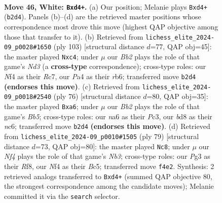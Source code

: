 \documentclass[11pt]{article}
\begin{document}
\clearpage

\begin{figure}[p]\centering
\begin{subfigure}{0.46\textwidth}\centering
\resizebox{\linewidth}{!}{%
\newchessgame
\chessboard[
  setfen={r2b4/1p5p/nk4pP/p4p2/P2prN2/3R2P1/1B6/R6K w - - 2 46},
  showmover=false,
  pgfstyle=straightmove, color=movearrow, markmove={b2-d4}
]}
\caption{}
\end{subfigure}\hfill
\begin{subfigure}{0.46\textwidth}\centering
\resizebox{\linewidth}{!}{%
\newchessgame
\chessboard[
  setfen={8/2r2kp1/1R1npp2/2r4P/p1P3KP/P3P3/2RN1P2/8 b - - 0 52},
  showmover=false,
  pgfstyle=straightmove, color=movearrow, markmove={d6-c4}
]}
\caption{}
\end{subfigure}
\\[4pt]
\begin{subfigure}{0.46\textwidth}\centering
\resizebox{\linewidth}{!}{%
\newchessgame
\chessboard[
  setfen={4r3/kb1p2p1/p1nr2N1/1B2pP2/R3P3/2P1K1P1/8/R7 w - - 13 39},
  showmover=false,
  pgfstyle=straightmove, color=movearrow, markmove={b5-a6}
]}
\caption{}
\end{subfigure}\hfill
\begin{subfigure}{0.46\textwidth}\centering
\resizebox{\linewidth}{!}{%
\newchessgame
\chessboard[
  setfen={r4rk1/P7/1n1p4/1RbPp3/4P3/5Pp1/6P1/R4K2 b - - 2 40},
  showmover=false,
  pgfstyle=straightmove, color=movearrow, markmove={b6-c8}
]}
\caption{}
\end{subfigure}
\caption{\textbf{Move 46, White: \texttt{Bxd4+}.} (a) Our position; Melanie plays \texttt{Bxd4+} (\texttt{b2d4}). Panels (b)--(d) are the retrieved master positions whose correspondence most drove this move (highest QAP objective among those that transfer to it). (b) Retrieved from \texttt{lichess\_elite\_2024-09\_p0028\#1650} (ply 103) [structural distance $d$=77, QAP obj=45]: the master played \texttt{Nxc4}; under $\mu$ our \emph{Bb2} plays the role of that game's \emph{Nd3} (a \textbf{cross-type} correspondence); cross-type roles: our \emph{N}f4 as their \emph{R}c7, our \emph{P}a4 as their \emph{r}b6; transferred move \texttt{b2d4} \textbf{(endorses this move)}. (c) Retrieved from \texttt{lichess\_elite\_2024-09\_p0018\#2540} (ply 76) [structural distance $d$=80, QAP obj=35]: the master played \texttt{Bxa6}; under $\mu$ our \emph{Bb2} plays the role of that game's \emph{Bb5}; cross-type roles: our \emph{n}a6 as their \emph{P}c3, our \emph{b}d8 as their \emph{n}c6; transferred move \texttt{b2d4} \textbf{(endorses this move)}. (d) Retrieved from \texttt{lichess\_elite\_2024-09\_p0010\#1505} (ply 79) [structural distance $d$=73, QAP obj=80]: the master played \texttt{Nc8}; under $\mu$ our \emph{Nf4} plays the role of that game's \emph{Nb3}; cross-type roles: our \emph{P}g3 as their \emph{R}f8, our \emph{N}f4 as their \emph{B}c5; transferred move \texttt{f4e2}. Synthesis: 2 retrieved analogs transferred to \texttt{Bxd4+} (summed QAP objective 80, the strongest correspondence among the candidate moves); Melanie committed it via the \texttt{search} selector.}
\label{fig:thought-m90}
\end{figure}
\end{document}
